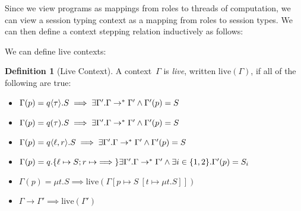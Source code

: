 \documentclass{article}
\theoremstyle{definition}
\newtheorem{defn}{Definition}
\newcommand{\subst}[3]{#1~[#2 \mapsto #3]}
\begin{document}
Since we view programs as mappings from roles to threads of computation, we can view a session typing context as a mapping from roles to session types.
We can then define a context stepping relation inductively as follows:

We can define live contexts:
\begin{defn}[Live Context]
  A context~$\Gamma$ is \emph{live}, written $\text{live}(\Gamma)$, if all of the following are true:
  \begin{itemize}
  \item $\Gamma(p) = q\langle\tau\rangle.S \implies \exists \Gamma'. \Gamma \to^\ast \Gamma' \land \Gamma'(p) = S$
  \item $\Gamma(p) = q(\tau).S \implies \exists \Gamma'. \Gamma \to^\ast \Gamma' \land \Gamma'(p) = S$
  \item $\Gamma(p) = q\langle\ell,r\rangle.S \implies \exists \Gamma'. \Gamma \to^\ast \Gamma' \land \Gamma'(p) = S$
  \item $\Gamma(p) = q.\{\ell \mapsto S ; r \mapsto \implies\} \exists \Gamma'. \Gamma \to^\ast \Gamma' \land \exists i \in \{1,2\}. \Gamma'(p) = S_i$
  \item $\Gamma(p) = \mu t.S \implies \text{live}(\Gamma[p \mapsto \subst{S}{t}{\mu t.S}])$
  \item $\Gamma \to \Gamma' \implies \text{live}(\Gamma')$
  \end{itemize}
\end{defn}
\end{document}
